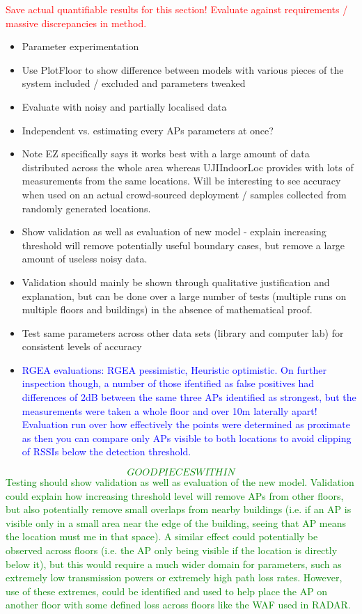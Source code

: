 \documentclass{UoYCSproject}
\begin{document}
		\textcolor{red}{Save actual quantifiable results for this section! Evaluate against requirements / massive discrepancies in method.}
		\begin{itemize}
			\item Parameter experimentation
			\item Use PlotFloor to show difference between models with various pieces of the system included / excluded and parameters tweaked
			\item Evaluate with noisy and partially localised data
            \item Independent vs. estimating every APs parameters at once?
			\item Note EZ specifically says it works best with a large amount of data distributed across the whole area whereas UJIIndoorLoc provides with lots of measurements from the same locations. Will be interesting to see accuracy when used on an actual crowd-sourced deployment / samples collected from randomly generated locations.
			\item Show validation as well as evaluation of new model - explain increasing threshold will remove potentially useful boundary cases, but remove a large amount of useless noisy data.
			\item Validation should mainly be shown through qualitative justification and explanation, but can be done over a large number of tests (multiple runs on multiple floors and buildings) in the absence of mathematical proof.
			\item Test same parameters across other data sets (library and computer lab) for consistent levels of accuracy
            \item \textcolor{blue}{RGEA evaluations: RGEA pessimistic, Heuristic optimistic. On further inspection though, a number of those ifentified as false positives had differences of 2dB between the same three APs identified as strongest, but the measurements were taken a whole floor and over 10m laterally apart! Evaluation run over how effectively the points were determined as proximate as then you can compare only APs visible to both locations to avoid clipping of RSSIs below the detection threshold.}
		\end{itemize}
		
		\textcolor{green}{\emph{\[GOOD PIECES WITHIN\]}Testing should show validation as well as evaluation of the new model. Validation could explain how increasing threshold level will remove APs from other floors, but also potentially remove small overlaps from nearby buildings (i.e. if an AP is visible only in a small area near the edge of the building, seeing that AP means the location must me in that space). A similar effect could potentially be observed across floors (i.e. the AP only being visible if the location is directly below it), but this would require a much wider domain for parameters, such as extremely low transmission powers or extremely high path loss rates. However, use of these extremes, could be identified and used to help place the AP on another floor with some defined loss across floors like the WAF used in RADAR.}
	
\end{document}
